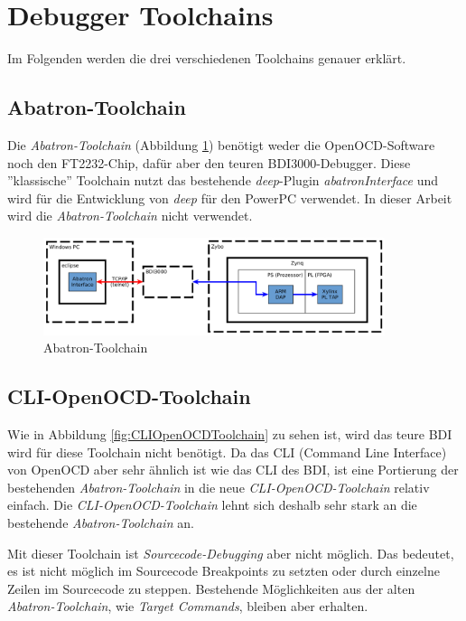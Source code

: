 \FloatBarrier
\section{Debugger Toolchains}
Im Folgenden werden die drei verschiedenen Toolchains genauer erklärt.

\subsection{Abatron-Toolchain}
Die \textit{Abatron-Toolchain} (Abbildung \ref{fig:AbatronToolchain}) benötigt weder die OpenOCD-Software noch den FT2232-Chip, dafür aber den teuren BDI3000-Debugger.
Diese ''klassische'' Toolchain nutzt das bestehende \textit{deep}-Plugin \textit{abatronInterface} und wird für die Entwicklung von \textit{deep} für den PowerPC verwendet.
In dieser Arbeit wird die \textit{Abatron-Toolchain} nicht verwendet.

\begin{figure}[htbp]
	\centering
		\includegraphics[width=10cm,height=\textheight,keepaspectratio]{graphs/abatronToolchain.png}
	\caption{Abatron-Toolchain}
	\label{fig:AbatronToolchain}
\end{figure}


\FloatBarrier
\subsection{CLI-OpenOCD-Toolchain}
Wie in Abbildung \ref{fig:CLIOpenOCDToolchain} zu sehen ist, wird das teure BDI wird für diese Toolchain nicht  benötigt.
Da das CLI (Command Line Interface) von OpenOCD aber sehr ähnlich ist wie das CLI des BDI, ist eine Portierung der bestehenden \textit{Abatron-Toolchain} in die neue \textit{CLI-OpenOCD-Toolchain} relativ einfach.
Die \textit{CLI-OpenOCD-Toolchain} lehnt sich deshalb sehr stark an die bestehende \textit{Abatron-Toolchain} an.

Mit dieser Toolchain ist \textit{Sourcecode-Debugging} aber nicht möglich.
Das bedeutet, es ist nicht möglich im Sourcecode Breakpoints zu setzten oder durch einzelne Zeilen im Sourcecode zu steppen.
Bestehende Möglichkeiten aus der alten \textit{Abatron-Toolchain}, wie \textit{Target Commands}, bleiben aber erhalten.

